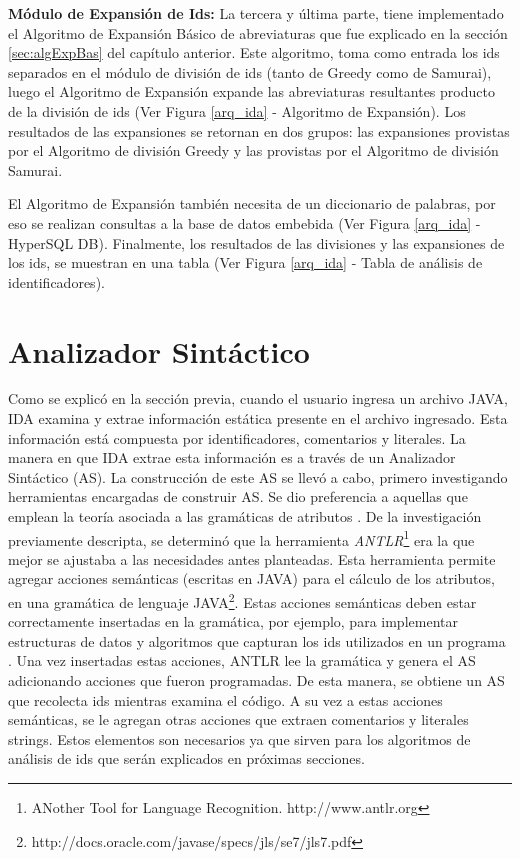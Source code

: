 \textbf{Módulo de Expansión de Ids:} La tercera y última parte, tiene implementado el Algoritmo de Expansión Básico de abreviaturas que fue explicado en la sección \ref{sec:algExpBas} del capítulo anterior.
Este algoritmo, toma como entrada los ids separados en el módulo de división de ids (tanto de Greedy como de Samurai), luego el Algoritmo de Expansión expande las abreviaturas resultantes producto de la división de ids (Ver Figura \ref{arq_ida} - Algoritmo de Expansión). Los resultados de las expansiones se retornan en dos grupos: las expansiones provistas por el Algoritmo de división Greedy y las provistas por el Algoritmo de división Samurai.


El \mbox{Algoritmo} de Expansión también necesita de un diccionario de palabras, por eso se realizan consultas a la base de datos embebida (Ver Figura \ref{arq_ida} - HyperSQL DB). Finalmente, los resultados de las divisiones y las expansiones de los ids, se muestran en una tabla (Ver Figura \ref{arq_ida} - Tabla de análisis de identificadores).

\section{Analizador Sintáctico}

Como se explicó en la sección previa, cuando el usuario ingresa un archivo JAVA, IDA examina y extrae información estática presente en el archivo ingresado. Esta información está compuesta por identificadores, comentarios y literales. La manera en que IDA extrae esta información es a través de un Analizador Sintáctico (AS).
La construcción de este AS se llevó a cabo, primero investigando herramientas encargadas de construir AS. Se dio preferencia a aquellas que emplean la teoría asociada a las gramáticas de atributos \cite{AHUL06}. De la investigación previamente descripta, se determinó que la herramienta \textit{ANTLR}\footnote[1]{ANother Tool for Language Recognition. http://www.antlr.org} era la que mejor se ajustaba a las necesidades antes planteadas. 
Esta herramienta permite agregar acciones semánticas (escritas en JAVA) para el cálculo de los atributos, en una gramática de lenguaje JAVA\footnote[2]{http://docs.oracle.com/javase/specs/jls/se7/jls7.pdf}. Estas acciones semánticas deben estar correctamente insertadas en la gramática, por ejemplo, para implementar estructuras de datos y algoritmos que capturan los ids utilizados en un programa \cite{AAJU83}. Una vez insertadas estas acciones, ANTLR lee la gramática y genera el AS adicionando acciones que fueron programadas. De esta manera, se obtiene un AS que recolecta ids mientras examina el código. A su vez a estas acciones semánticas, se le agregan otras acciones que extraen comentarios y literales strings. Estos elementos son necesarios ya que sirven para los algoritmos de análisis de ids que serán explicados en próximas secciones.

